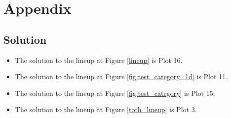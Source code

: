 %


\section*{Appendix}

\subsection*{Solution}
\begin{itemize}
\item The solution to the lineup at Figure \ref{lineup} is Plot 16. 
\item The solution to the lineup at Figure \ref{fig:test_category_1d} is Plot 11.
\item The solution to the lineup at Figure \ref{fig:test_category} is Plot 15.
\item The solution to the lineup at Figure \ref{toth_lineup} is Plot 3.


\end{itemize}


